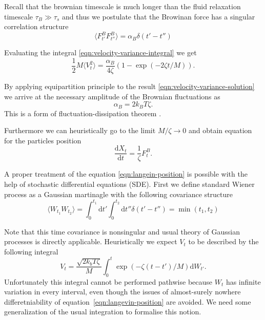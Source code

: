 \documentclass{doctoral}
\newcommand{\dd}{\mathrm{d}}
\begin{document}
Recall that the brownian timescale is much longer than the fluid relaxation timescale $\tau_B \gg \tau_s$ and thus we postulate that the Browinan force has a singular correlation structure
\begin{equation}
    \langle F_{t'}^B F_{t''}^B \rangle = \alpha_B \delta(t'-t'')
    \label{eqn:white-noise-langevin}
\end{equation}

Evaluating the integral \eqref{eqn:velocity-variance-integral} we get
\begin{equation}
    \frac{1}{2} M \langle V_t^2 \rangle = \frac{\alpha_B}{4 \zeta} (1 - \exp(-2\zeta t / M)).
    \label{eqn:velocity-variance-solution}
\end{equation}

By applying equipartition principle to the result \eqref{eqn:velocity-variance-solution} we arrive at the necessary amplitude of the Brownian fluctuations as
\begin{equation}
    \alpha_B = 2 k_B T \zeta.
    \label{eqn:fluctuation-dissipation-raighley-particle}
\end{equation}
This is a form of fluctuation-dissipation theorem \cite{van_Kampen_1984,Ottinger_2012}.

Furthermore we can heuristically go to the limit $M/\zeta \to 0$ and obtain equation for the particles position 
\begin{equation}
    \frac{\dd X_t}{\dd t} = \frac{1}{\zeta} F_t^B.
    \label{eqn:langevin-position}
\end{equation}

A proper treatment of the equation \eqref{eqn:langein-position} is possible with the help of stochastic differential equations (SDE). First we define standard Wiener process as a Gaussian martinagle with the following covariance structure
\begin{equation}
    \langle W_{t_1} W_{t_2} \rangle = \int_0^{t_1} \dd t' \int_0^{t_2} \dd t'' \delta(t' - t'') = \min(t_1, t_2)
    \label{eqn:wiener-process-definition}
\end{equation}

Note that this time covariance is nonsingular and usual theory of Gaussian processes is directly applicable. Heuristically we expect $V_t$ to be described by the following integral
\begin{equation}
    V_t = \frac{\sqrt{2 k_b T \zeta}}{M} \int_0^t \exp\left( -\zeta(t - t')/M \right) \dd W_{t'}.
    \label{eqn:velocity-integral-sde}
\end{equation}
Unfortunately this integral cannot be performed pathwise because $W_t$ has infinite variation in every interval, even though the issues of almost-surely nowhere differetniability of equation~\eqref{eqn:langevin-position} are avoided. We need some generalization of the usual integration to formalise this notion.
\end{document}
